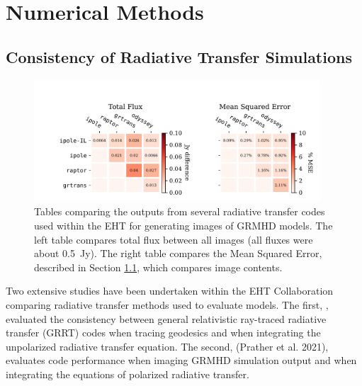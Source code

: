 \section{Numerical Methods}\label{app:numerical}


\subsection{Consistency of Radiative Transfer Simulations}\label{app:radtrans}

\begin{figure}
  \centering
  \includegraphics[width=0.95\textwidth]{figures/grmhd_hi_IntegratedUnpolarizeds_plot.pdf}
  \caption{Tables comparing the outputs from several radiative transfer codes used within the EHT for generating images of GRMHD models.  The left table compares total flux between all images (all fluxes were about 0.5~Jy). The right table compares the Mean Squared Error, described in Section \ref{app:radtrans}, which compares image contents.}
  \label{fig:radtrans_grmhd_comp}
\end{figure}

Two extensive studies have been undertaken within the EHT Collaboration comparing radiative transfer methods used to evaluate models. The first, \cite{2020ApJ...897..148G}, evaluated the consistency between general relativistic ray-traced radiative transfer (GRRT) codes when tracing geodesics and when integrating the unpolarized radiative transfer equation. The second, (Prather et al. 2021), evaluates code performance when imaging GRMHD simulation output and when integrating the equations of polarized radiative transfer.

